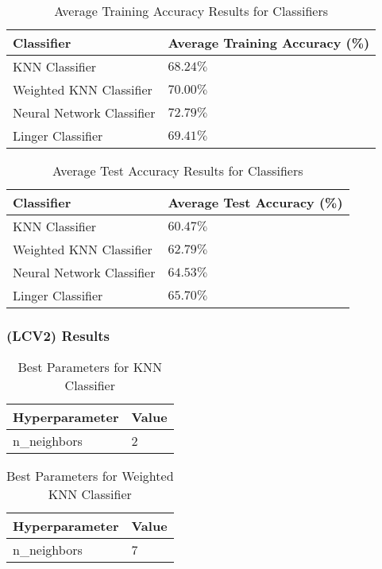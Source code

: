 \documentclass[a4paper, 12pt]{report}
\begin{document}
\begin{table}[H]
    \centering
    \caption{Average Training Accuracy Results for Classifiers}
    \label{tab:average_results_train_LCV1_Glass}
    \begin{tabular}{|l|l|}
    \hline
    \textbf{Classifier} & \textbf{Average Training Accuracy (\%)} \\ \hline
    KNN Classifier & $68.24\%$ \\ \hline
    Weighted KNN Classifier & $70.00\%$ \\ \hline
    Neural Network Classifier & $72.79\%$ \\ \hline
    Linger Classifier & $69.41\%$ \\ \hline
    \end{tabular}
    \end{table}

\begin{table}[H]
    \centering
    \caption{Average Test Accuracy Results for Classifiers}
    \label{tab:average_results_test_LCV1_Glass}
    \begin{tabular}{|l|l|}
    \hline
    \textbf{Classifier} & \textbf{Average Test Accuracy (\%)} \\ \hline
    KNN Classifier & $60.47\%$ \\ \hline
    Weighted KNN Classifier & $62.79\%$ \\ \hline
    Neural Network Classifier & $64.53\%$ \\ \hline
    Linger Classifier & $65.70\%$ \\ \hline
    \end{tabular}
\end{table}

\subsubsection{(LCV2) Results}

\begin{table}[H]
    \centering
    \caption{Best Parameters for KNN Classifier}
    \label{tab:best_parameters_knn_LCV2_Glass}
    \begin{tabular}{|l|l|}
    \hline
    \textbf{Hyperparameter} & \textbf{Value} \\ \hline
    n\_neighbors & 2 \\ \hline
    \end{tabular}
\end{table}

\begin{table}[H]
    \centering
    \caption{Best Parameters for Weighted KNN Classifier}
    \label{tab:best_parameters_weighted_knn_LCV2_Glass}
    \begin{tabular}{|l|l|}
    \hline
    \textbf{Hyperparameter} & \textbf{Value} \\ \hline
    n\_neighbors & 7 \\ \hline
    \end{tabular}
\end{table}
\end{document}

